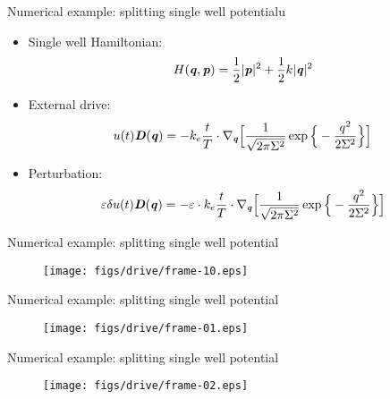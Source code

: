 \documentclass[fleqn]{beamer}
\newcommand{\bluec}[1]{{\color{blue} #1}}
\newcommand{\vect}[1]{\textbf{\textit{#1}}}
\newcommand{\eps}{\varepsilon}
\begin{document}
\begin{frame}{Numerical example: splitting single well potentialu}
  \begin{itemize}
  \item<1-> Single well Hamiltonian:
    \bluec{
      \begin{align*}
        H(\vect q, \vect p) = \frac12\vert \vect p\vert^2 + \frac12 k\vert \vect q\vert^2
      \end{align*}
    }
  \item<2-> External drive:
    \bluec{
      \begin{align*}
        u(t)\vect D(\vect q) = - k_e \frac{t}{T}\cdot
        \nabla_{\vect q}
        \Big[
        \frac{1}{\sqrt{2\pi \Sigma^2}} \exp\Big\{-\frac{ q^2}{2\Sigma^2}\Big\}
        \Big]
      \end{align*}
    }
  \item<3-> Perturbation:
    \bluec{
      \begin{align*}
        \eps\delta u(t)\vect D(\vect q) = - \eps\cdot k_e \frac{t}{T}\cdot
        \nabla_{\vect q}
        \Big[
        \frac{1}{\sqrt{2\pi \Sigma^2}} \exp\Big\{-\frac{ q^2}{2\Sigma^2}\Big\}
        \Big]        
      \end{align*}
    }
  \end{itemize}
\end{frame}


\begin{frame}{Numerical example: splitting single well potential}
  \begin{figure}
    \texttt{[image: figs/drive/frame-10.eps]}
  \end{figure}  
\end{frame}

\begin{frame}{Numerical example: splitting single well potential}
  \addtocounter{framenumber}{-1}
  \begin{figure}
    \texttt{[image: figs/drive/frame-01.eps]}
  \end{figure}  
\end{frame}

\begin{frame}{Numerical example: splitting single well potential}
  \addtocounter{framenumber}{-1}
  \begin{figure}
    \texttt{[image: figs/drive/frame-02.eps]}
  \end{figure}  
\end{frame}
\end{document}
